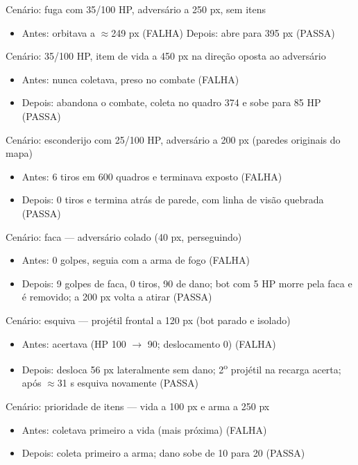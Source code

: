 \documentclass[a4paper,12pt]{article}
\begin{document}
\vspace{0.3cm}
Cenário: fuga com 35/100 HP, adversário a 250 px, sem itens
\begin{itemize}
  \item Antes: orbitava a $\approx$249 px (FALHA) \quad Depois: abre para 395 px (PASSA)
\end{itemize}

\vspace{0.3cm}
Cenário: 35/100 HP, item de vida a 450 px na direção oposta ao adversário
\begin{itemize}
  \item Antes: nunca coletava, preso no combate (FALHA)
  \item Depois: abandona o combate, coleta no quadro 374 e sobe para 85 HP (PASSA)
\end{itemize}

\vspace{0.3cm}
Cenário: esconderijo com 25/100 HP, adversário a 200 px (paredes originais do mapa)
\begin{itemize}
  \item Antes: 6 tiros em 600 quadros e terminava exposto (FALHA)
  \item Depois: 0 tiros e termina atrás de parede, com linha de visão quebrada (PASSA)
\end{itemize}

\vspace{0.3cm}
Cenário: faca --- adversário colado (40 px, perseguindo)
\begin{itemize}
  \item Antes: 0 golpes, seguia com a arma de fogo (FALHA)
  \item Depois: 9 golpes de faca, 0 tiros, 90 de dano; bot com 5 HP morre pela faca e é
        removido; a 200 px volta a atirar (PASSA)
\end{itemize}

\vspace{0.3cm}
Cenário: esquiva --- projétil frontal a 120 px (bot parado e isolado)
\begin{itemize}
  \item Antes: acertava (HP 100 $\to$ 90; deslocamento 0) (FALHA)
  \item Depois: desloca 56 px lateralmente sem dano; 2\textsuperscript{o} projétil na recarga
        acerta; após $\approx$31 s esquiva novamente (PASSA)
\end{itemize}

\vspace{0.3cm}
Cenário: prioridade de itens --- vida a 100 px e arma a 250 px
\begin{itemize}
  \item Antes: coletava primeiro a vida (mais próxima) (FALHA)
  \item Depois: coleta primeiro a arma; dano sobe de 10 para 20 (PASSA)
\end{itemize}
\end{document}
